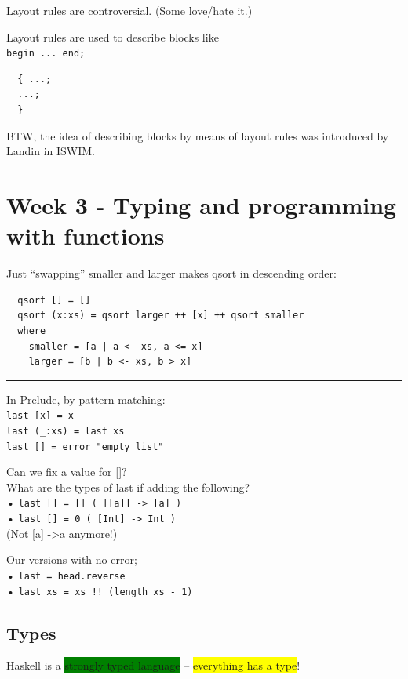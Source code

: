 \documentclass[tikz,border=10pt]{project_plan}
\newcommand{\sectionbreak}{%
\begin{center}
  \noindent\rule{8cm}{0.4pt}
\end{center}
}
\begin{document}
Layout rules are controversial. (Some love/hate it.)

Layout rules are used to describe blocks like\\
\lstinline|begin ... end;|

\begin{lstlisting}
  { ...;
  ...;
  }
\end{lstlisting}

BTW, the idea of describing blocks by means of
layout rules was introduced by Landin in ISWIM.


\chapter{Week 3 - Typing and programming with functions}

Just “swapping” smaller and larger makes qsort in descending order:
\begin{lstlisting}
  qsort [] = []
  qsort (x:xs) = qsort larger ++ [x] ++ qsort smaller
  where
    smaller = [a | a <- xs, a <= x]
    larger = [b | b <- xs, b > x]
\end{lstlisting}

\sectionbreak

In Prelude, by pattern matching:\\
\lstinline|last [x] = x|\\
\lstinline|last (_:xs) = last xs|\\
\lstinline|last [] = error "empty list"|

Can we fix a value for []?\\
What are the types of last if adding the following?\\
• \lstinline|last [] = [] ( [[a]] -> [a] )|\\
• \lstinline|last [] = 0 ( [Int] -> Int )|\\
(Not [a] -\textgreater a anymore!)

Our versions with no error;\\
• \lstinline|last = head.reverse|\\
• \lstinline|last xs = xs !! (length xs - 1)|

\section{Types}

Haskell is a \colorbox{green}{strongly typed language} – \colorbox{yellow}{everything has a type}!
\end{document}
